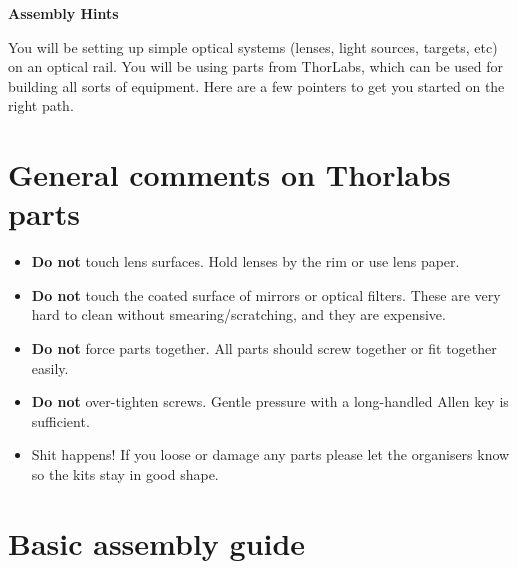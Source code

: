\documentclass[a4paper]{report}
\begin{document}
	
	\setcounter{secnumdepth}{2}
	
	\begin{center}
		\textbf{\Large{Assembly Hints}}
	\end{center}
	
	You will be setting up simple optical systems (lenses, light sources, targets, etc) on an optical rail. 
        You will be using parts from ThorLabs, which can be used for building all sorts of equipment. 
	Here are a few pointers to get you started on the right path.
	

	\section{General comments on Thorlabs parts}
	
	\begin{itemize}
		\item \textbf{Do not} touch lens surfaces. Hold lenses by the rim or use lens paper.
		\item \textbf{Do not} touch the coated surface of mirrors or optical filters. These are very hard to clean without smearing/scratching, and they are expensive.
		\item \textbf{Do not} force parts together. All parts should screw together or fit together easily.
		\item \textbf{Do not} over-tighten screws. Gentle pressure with a long-handled Allen key is sufficient. 
		\item Shit happens! If you loose or damage any parts please let the organisers know so the kits stay in good shape.
	\end{itemize}
	
	\section{Basic assembly guide}
	
\end{document}
